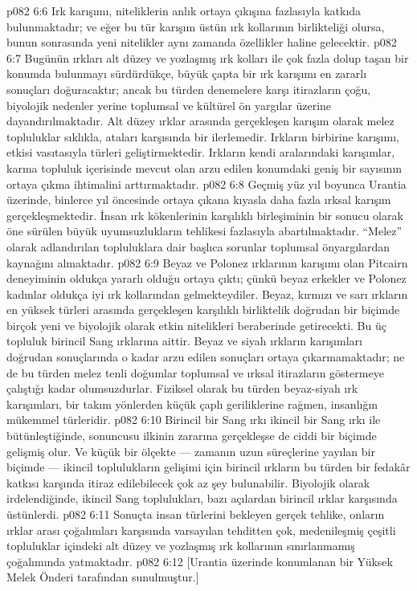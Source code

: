 \vs p082 6:6 Irk karışımı,  niteliklerin anlık ortaya çıkışına fazlasıyla katkıda bulunmaktadır; ve eğer bu tür karışım üstün ırk kollarının birlikteliği olursa, bunun sonrasında yeni nitelikler aynı zamanda  özellikler haline gelecektir.
\vs p082 6:7 Bugünün ırkları alt düzey ve yozlaşmış ırk kolları ile çok fazla dolup taşan bir konumda bulunmayı sürdürdükçe, büyük çapta bir ırk karışımı en zararlı sonuçları doğuracaktır; ancak bu türden denemelere karşı itirazların çoğu, biyolojik nedenler yerine toplumsal ve kültürel ön yargılar üzerine dayandırılmaktadır. Alt düzey ırklar arasında gerçekleşen karışım olarak melez topluluklar sıklıkla, ataları karşısında bir ilerlemedir. Irkların birbirine karışımı,  etkisi vasıtasıyla türleri geliştirmektedir. Irkların kendi aralarındaki karışımlar, karma topluluk içerisinde mevcut olan arzu edilen konumdaki geniş bir sayısının ortaya çıkma ihtimalini arttırmaktadır.
\vs p082 6:8 Geçmiş yüz yıl boyunca Urantia üzerinde, binlerce yıl öncesinde ortaya çıkana kıyasla daha fazla ırksal karışım gerçekleşmektedir. İnsan ırk kökenlerinin karşılıklı birleşiminin bir sonucu olarak öne sürülen büyük uyumsuzlukların tehlikesi fazlasıyla abartılmaktadır. “Melez” olarak adlandırılan topluluklara dair başlıca sorunlar toplumsal önyargılardan kaynağını almaktadır.
\vs p082 6:9 Beyaz ve Polonez ırklarının karışımı olan Pitcairn deneyiminin oldukça yararlı olduğu ortaya çıktı; çünkü beyaz erkekler ve Polonez kadınlar oldukça iyi ırk kollarından gelmekteydiler. Beyaz, kırmızı ve sarı ırkların en yüksek türleri arasında gerçekleşen karşılıklı birliktelik doğrudan bir biçimde birçok yeni ve biyolojik olarak etkin nitelikleri beraberinde getirecekti. Bu üç topluluk birincil Sang ırklarına aittir. Beyaz ve siyah ırkların karışımları doğrudan sonuçlarında o kadar arzu edilen sonuçları ortaya çıkarmamaktadır; ne de bu türden melez tenli doğumlar toplumsal ve ırksal itirazların göstermeye çalıştığı kadar olumsuzdurlar. Fiziksel olarak bu türden beyaz\hyp{}siyah ırk karışımları, bir takım yönlerden küçük çaplı geriliklerine rağmen, insanlığın mükemmel türleridir.
\vs p082 6:10 Birincil bir Sang ırkı ikincil bir Sang ırkı ile bütünleştiğinde, sonuncusu ilkinin zararına gerçekleşse de ciddi bir biçimde gelişmiş olur. Ve küçük bir ölçekte --- zamanın uzun süreçlerine yayılan bir biçimde --- ikincil toplulukların gelişimi için birincil ırkların bu türden bir fedakâr katkısı karşında itiraz edilebilecek çok az şey bulunabilir. Biyolojik olarak irdelendiğinde, ikincil Sang toplulukları, bazı açılardan birincil ırklar karşısında üstünlerdi.
\vs p082 6:11 Sonuçta insan türlerini bekleyen gerçek tehlike, onların ırklar arası çoğalımları karşısında varsayılan tehditten çok, medenileşmiş çeşitli topluluklar içindeki alt düzey ve yozlaşmış ırk kollarının sınırlanmamış çoğalımında yatmaktadır.
\vs p082 6:12 [Urantia üzerinde konumlanan bir Yüksek Melek Önderi tarafından sunulmuştur.]
